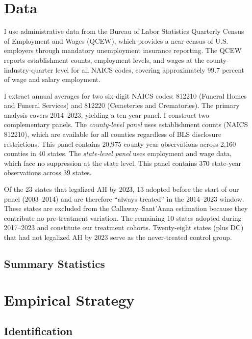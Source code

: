 \documentclass[12pt]{article}
\begin{document}
\section{Data}

I use administrative data from the Bureau of Labor Statistics Quarterly Census of Employment and Wages (QCEW), which provides a near-census of U.S. employers through mandatory unemployment insurance reporting. The QCEW reports establishment counts, employment levels, and wages at the county-industry-quarter level for all NAICS codes, covering approximately 99.7 percent of wage and salary employment.

I extract annual averages for two six-digit NAICS codes: 812210 (Funeral Homes and Funeral Services) and 812220 (Cemeteries and Crematories). The primary analysis covers 2014--2023, yielding a ten-year panel. I construct two complementary panels. The \emph{county-level panel} uses establishment counts (NAICS 812210), which are available for all counties regardless of BLS disclosure restrictions. This panel contains 20,975 county-year observations across 2,160 counties in 40 states. The \emph{state-level panel} uses employment and wage data, which face no suppression at the state level. This panel contains 370 state-year observations across 39 states.

Of the 23 states that legalized AH by 2023, 13 adopted before the start of our panel (2003--2014) and are therefore ``always treated'' in the 2014--2023 window. These states are excluded from the Callaway--Sant'Anna estimation because they contribute no pre-treatment variation. The remaining 10 states adopted during 2017--2023 and constitute our treatment cohorts. Twenty-eight states (plus DC) that had not legalized AH by 2023 serve as the never-treated control group.

\subsection{Summary Statistics}




\section{Empirical Strategy}

\subsection{Identification}
\end{document}

